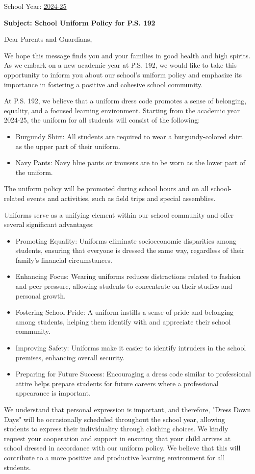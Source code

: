 \documentclass[12pt,letterpaper]{article}
\begin{document}
\vspace*{0.5in}
School Year: \href{https://www.ps192.org}{2024-25} 

\textbf{Subject: School Uniform Policy for P.S. 192}

Dear Parents and Guardians,

We hope this message finds you and your families in good health and high spirits. As we embark on a new
academic year at P.S. 192, we would like to take this opportunity to inform you about our school's uniform policy
and emphasize its importance in fostering a positive and cohesive school community.

At P.S. 192, we believe that a uniform dress code promotes a sense of belonging, equality, and a focused learning
environment. Starting from the academic year 2024-25, the uniform for all students will consist of the following:
\begin{itemize}
	\item Burgundy Shirt: All students are required to wear a burgundy-colored shirt as the upper part of
their uniform.
	\item Navy Pants: Navy blue pants or trousers are to be worn as the lower part of the uniform.
\end{itemize}
The uniform policy will be promoted during school hours and on all school-related events and activities, such as
field trips and special assemblies.

Uniforms serve as a unifying element within our school community and offer several significant advantages:
		\begin{itemize}
		\item Promoting Equality: Uniforms eliminate socioeconomic disparities among students, ensuring that everyone is dressed the same way, regardless of their family's financial circumstances.
		\item Enhancing Focus: Wearing uniforms reduces distractions related to fashion and peer pressure,
allowing students to concentrate on their studies and personal growth.
		\item Fostering School Pride: A uniform instills a sense of pride and belonging among students, helping
them identify with and appreciate their school community.
		\item Improving Safety: Uniforms make it easier to identify intruders in the school premises, enhancing
overall security.
		\item Preparing for Future Success: Encouraging a dress code similar to professional attire helps
prepare students for future careers where a professional appearance is important.
		\end{itemize}
We understand that personal expression is important, and therefore, "Dress Down Days" will be occasionally scheduled throughout the school year, allowing
students to express their individuality through clothing choices.
\pagebreak
\vspace*{1.5cm}
We kindly request your cooperation and support in ensuring that your child
arrives at school dressed in accordance with our uniform policy. We believe that
this will contribute to a more positive and productive learning environment for
all students.
\end{document}
